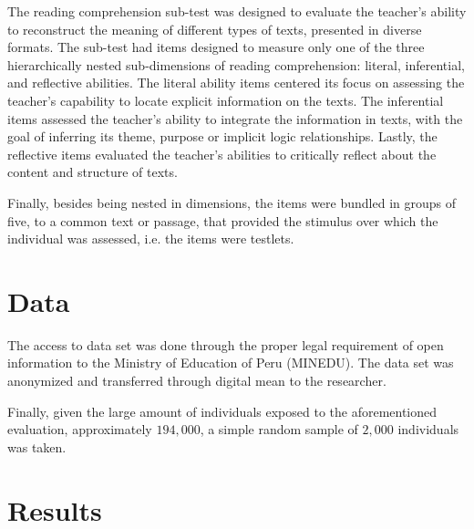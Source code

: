 The reading comprehension sub-test was designed to evaluate the teacher's ability to reconstruct the meaning of different types of texts, presented in diverse formats. The sub-test had items designed to measure only one of the three hierarchically nested sub-dimensions of reading comprehension: literal, inferential, and reflective abilities. The literal ability items centered its focus on assessing the teacher's capability to locate explicit information on the texts. The inferential items assessed the teacher's ability to integrate the information in texts, with the goal of inferring its theme, purpose or implicit logic relationships. Lastly, the reflective items evaluated the teacher's abilities to critically reflect about the content and structure of texts.

Finally, besides being nested in dimensions, the items were bundled in groups of five, to a common text or passage, that provided the stimulus over which the individual was assessed, i.e. the items were testlets. 



\section{Data}

The access to data set was done through the proper legal requirement of open information to the Ministry of Education of Peru (MINEDU). The data set was anonymized and transferred through digital mean to the researcher.

Finally, given the large amount of individuals exposed to the aforementioned evaluation, approximately $194,000$, a simple random sample of $2,000$ individuals was taken.


\section{Results}

